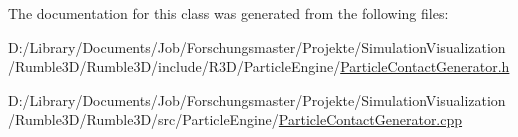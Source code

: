 The documentation for this class was generated from the following files\+:\begin{DoxyCompactItemize}
\item 
D\+:/\+Library/\+Documents/\+Job/\+Forschungsmaster/\+Projekte/\+Simulation\+Visualization/\+Rumble3\+D/\+Rumble3\+D/include/\+R3\+D/\+Particle\+Engine/\mbox{\hyperlink{_particle_contact_generator_8h}{Particle\+Contact\+Generator.\+h}}\item 
D\+:/\+Library/\+Documents/\+Job/\+Forschungsmaster/\+Projekte/\+Simulation\+Visualization/\+Rumble3\+D/\+Rumble3\+D/src/\+Particle\+Engine/\mbox{\hyperlink{_particle_contact_generator_8cpp}{Particle\+Contact\+Generator.\+cpp}}\end{DoxyCompactItemize}
